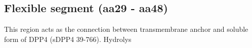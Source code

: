 \subsection{Flexible segment (aa29 - aa48)}

This region acts as the connection between transmembrane anchor and soluble form of DPP4 (sDPP4 39-766). Hydrolys
